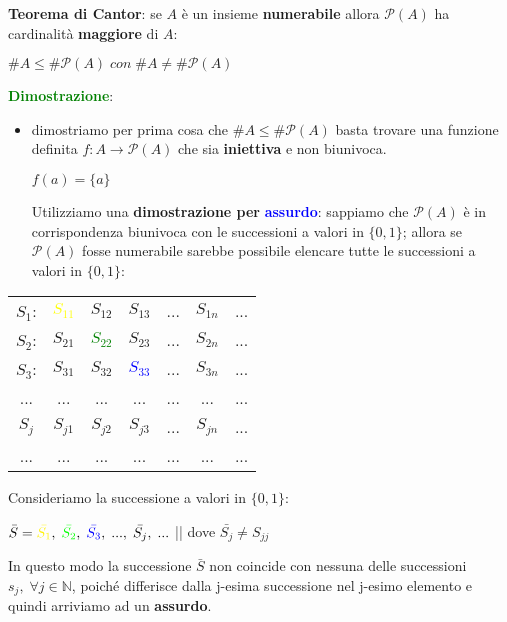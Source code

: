 \newpage
\textbf{Teorema di Cantor}: se $A$ è un insieme \textbf{numerabile} allora $\mathcal{P}(A)$ ha cardinalità \textbf{maggiore} di $A$:
\begin{center}
    $\#A \leq \#\mathcal{P}(A) \; con \; \#A \neq \#\mathcal{P}(A)$
\end{center}
\textcolor{green}{\textbf{Dimostrazione}}: 
\begin{itemize}
    \item dimostriamo per prima cosa che $\#A \leq \#\mathcal{P}(A)$ basta trovare una funzione definita $f : A \rightarrow \mathcal{P}(A)$ che sia \textbf{iniettiva} e non biunivoca.
    \begin{center}
        $f(a) = \{a\}$

    \end{center}
    Utilizziamo una \textbf{dimostrazione per} \textcolor{blue}{\textbf{assurdo}}: sappiamo che $\mathcal{P}(A)$ è in corrispondenza biunivoca con le successioni a valori in $\{0,1\}$; allora se $\mathcal{P}(A)$ fosse numerabile sarebbe possibile elencare tutte le successioni a valori in $\{0,1\}$:
\end{itemize}
\begin{center}
    \begin{tabular}{ccccccc}
        $S_1$: & \textcolor{yellow}{$S_{11}$} & $S_{12}$ & $S_{13}$ & ... & $S_{1n}$ & ... \\
        $S_2$: & $S_{21}$ & \textcolor{green}{$S_{22}$} & $S_{23}$ & ... & $S_{2n}$ & ... \\
        $S_3$: & $S_{31}$ & $S_{32}$ & \textcolor{blue}{$S_{33}$} & ... & $S_{3n}$ & ... \\
        ... & ... & ... & ... & ... & ... & ... \\
        $S_j$ & $S_{j1}$ & $S_{j2}$ & $S_{j3}$ & ... & $S_{jn}$ & ... \\
        ... & ... & ... & ... & ... & ... & ... \\
    \end{tabular}
\end{center}
Consideriamo la successione a valori in $\{0, 1\}$:
\begin{center}
    $\bar{S} = \textcolor{yellow}{\bar{S_1}}, \; \textcolor{green}{\bar{S_2}}, \; \textcolor{blue}{\bar{S_3}}, \; ..., \; \bar{S_j}, \; ...$ || dove $\bar{S_j} \neq S_{jj}$
\end{center}
In questo modo la successione $\bar{S}$ non coincide con nessuna delle successioni $s_j, \; \forall j \in \mathbb{N}$, poiché differisce dalla j-esima successione nel j-esimo elemento e quindi arriviamo ad un \textbf{assurdo}.
